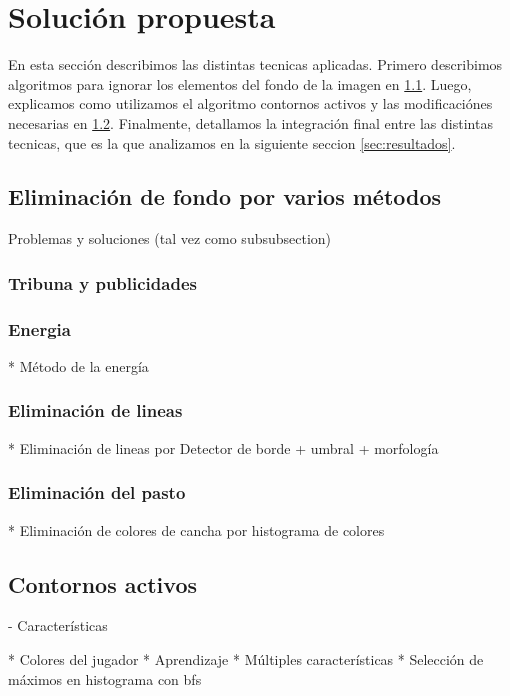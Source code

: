 \section{Solución propuesta}
\label{sec:solution}

En esta sección describimos las distintas tecnicas aplicadas. Primero describimos algoritmos para
ignorar los elementos del fondo de la imagen en \ref{sec:background-elimination}. Luego, explicamos
como utilizamos el algoritmo contornos activos\cite{fast-level-set} y las modificaciónes necesarias
en \ref{sec:ac}. Finalmente, detallamos la integración final entre las distintas tecnicas, que es
la que analizamos en la siguiente seccion \ref{sec:resultados}.

\subsection{Eliminación de fondo por varios métodos}
\label{sec:background-elimination}
Problemas y soluciones (tal vez como subsubsection)

\subsubsection{Tribuna y publicidades}

\subsubsection{Energia}
  * Método de la energía

\subsubsection{Eliminación de lineas}
  * Eliminación de lineas por Detector de borde + umbral + morfología

\subsubsection{Eliminación del pasto}
  * Eliminación de colores de cancha por histograma de colores


\subsection{Contornos activos}
\label{sec:ac}

- Características

  * Colores del jugador
  * Aprendizaje
  * Múltiples características
  * Selección de máximos en histograma con bfs

